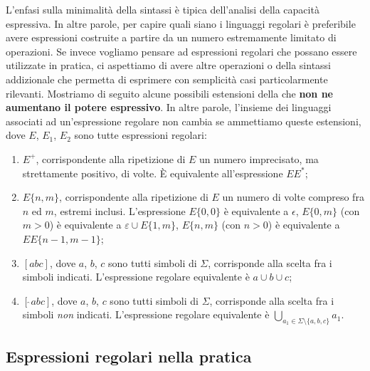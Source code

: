 L'enfasi sulla minimalità della sintassi è tipica dell'analisi della capacità espressiva.
In altre parole, per capire quali siano i linguaggi regolari è preferibile avere espressioni costruite a partire da un
numero estremamente limitato di operazioni.
Se invece vogliamo pensare ad espressioni regolari che possano essere utilizzate in pratica, ci aspettiamo di avere
altre operazioni o della sintassi addizionale che permetta di esprimere con semplicità casi particolarmente rilevanti.
Mostriamo di seguito alcune possibili estensioni della  che \textbf{non ne aumentano il potere espressivo}.
In altre parole, l'insieme dei linguaggi associati ad un'espressione regolare non cambia se ammettiamo queste
estensioni, dove $E$, $E_1$, $E_2$ sono tutte espressioni regolari:

\begin{enumerate}
	\item $E^{+}$, corrispondente  alla ripetizione di $E$ un numero imprecisato, ma strettamente positivo,  di volte.
	      È equivalente all'espressione $E E^{*}$;
	\item $E\{n,m\}$, corrispondente  alla ripetizione di $E$ un numero di volte compreso fra $n$ ed $m$, estremi inclusi.
	      L'espressione $E\{0,0\}$ è equivalente a $\epsilon$, $E\{0,m\}$ (con $m>0$) è equivalente a $\varepsilon \cup E\{1,m\}$,
	      $E\{n,m\}$ (con $n>0$) è equivalente a $E E\{n-1,m-1\}$;
	\item $[abc]$, dove $a$, $b$, $c$ sono tutti simboli di $\Sigma$, corrisponde alla scelta fra i simboli indicati.
	      L'espressione regolare equivalente è $a\cup b\cup c$;
	\item $[\widehat{\,} abc]$, dove $a$, $b$, $c$ sono tutti simboli di $\Sigma$, corrisponde alla scelta fra i simboli \emph{non} indicati.
	      L'espressione regolare equivalente è $\bigcup_{a_{1}\in \Sigma \setminus \{a,b,c\}} a_{1}$.
\end{enumerate}


\subsection{Espressioni regolari nella pratica}\label{sec:regex-pratica}




